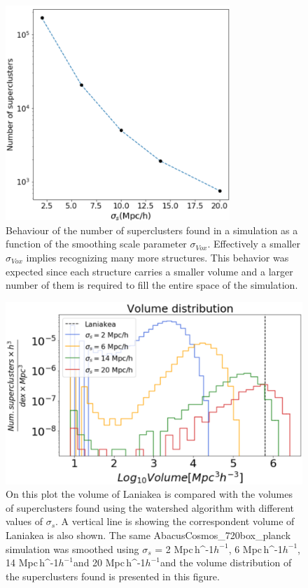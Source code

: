 \documentclass[usenatbib]{mnras}
\newcommand{\Mpch}{\,{\rm Mpc}\,\ifmmode h^{-1}\else $h^{-1}$\fi}
\begin{document}
\begin{figure}
    \centering
    \includegraphics[width=240pt]{num_superclusters.pdf}
    \caption{Behaviour of the number of superclusters found in a
      simulation as a function of the smoothing scale parameter
      $\sigma_{Vox}$. Effectively a smaller $\sigma_{Vox}$ implies
      recognizing many more structures. 
This behavior was expected since each structure carries a smaller
volume and a larger number of them is required to fill the entire
space of the simulation.}  
    \label{fig:Nclusters}
\end{figure}


\begin{figure}
    \centering
    \includegraphics[width=345pt]{vol_different_sigmas.pdf}
    \caption{On this plot the volume of Laniakea is compared with the
      volumes of superclusters found using the watershed algorithm
      with different values of $\sigma_s$. A vertical line is showing
      the correspondent volume of Laniakea is also shown. The same
      AbacusCosmos\_720box\_planck simulation was smoothed using
      $\sigma_s$ = 2\,\Mpch, 6\,\Mpch, 14\,\Mpch and 20\,\Mpch and the
      volume distribution of the superclusters found is presented in
      this figure.}  
    \label{fig:HISTVMD2}
\end{figure}
\end{document}
